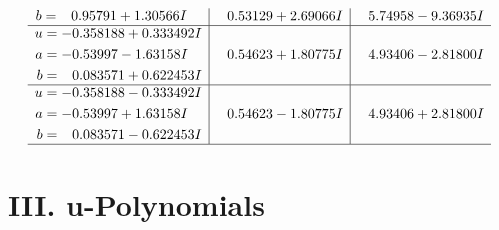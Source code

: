 \documentclass[1p]{elsarticle_modified}
\theoremstyle{definition}
\begin{document}
$$\begin{array}{c|c|c}
\begin{aligned}
b &= \phantom{-}0.95791 + 1.30566 I\end{aligned}
 & \phantom{-}0.53129 + 2.69066 I & \phantom{-}5.74958 - 9.36935 I \\ \hline\begin{aligned}
u &= -0.358188 + 0.333492 I \\
a &= -0.53997 - 1.63158 I \\
b &= \phantom{-}0.083571 + 0.622453 I\end{aligned}
 & \phantom{-}0.54623 + 1.80775 I & \phantom{-}4.93406 - 2.81800 I \\ \hline\begin{aligned}
u &= -0.358188 - 0.333492 I \\
a &= -0.53997 + 1.63158 I \\
b &= \phantom{-}0.083571 - 0.622453 I\end{aligned}
 & \phantom{-}0.54623 - 1.80775 I & \phantom{-}4.93406 + 2.81800 I\\
 \hline 
 \end{array}$$\newpage
\newpage\renewcommand{\arraystretch}{1}
\centering \section*{ III. u-Polynomials}
\end{document}
